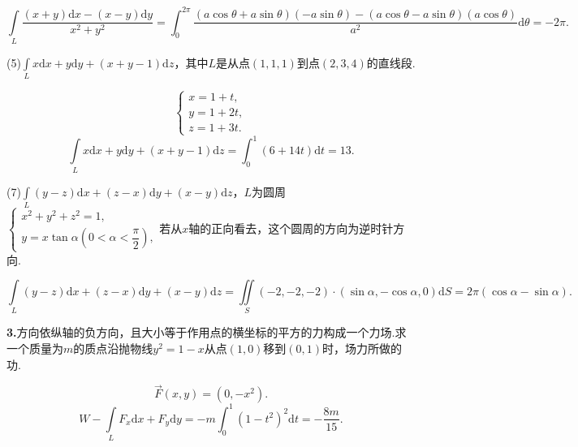 \documentclass[12pt, a4paper]{article}
\newcommand{\dif}{\mathrm{d}}
\begin{document}
\[\int\limits_L \dfrac{(x + y) \dif x - (x - y) \dif y}{x^2 + y^2} = \int_{0}^{2\pi} \frac{(a\cos\theta + a\sin\theta)(-a\sin\theta) - (a\cos\theta - a\sin\theta)(a\cos\theta)}{a^2} \dif \theta = -2\pi.\]

(5)\(\int\limits_L x \dif x + y \dif y + (x + y - 1) \dif z\)，其中\(L\)是从点\((1, 1, 1)\)到点\((2, 3, 4)\)的直线段.

\[\begin{cases}
x = 1 + t, \\
y = 1 + 2t, \\
z = 1 + 3t.
\end{cases}\]
\[\int\limits_L x \dif x + y \dif y + (x + y - 1) \dif z = \int_0^1 (6 + 14t) \dif t = 13.\]

(7)\(\int\limits_L (y - z) \dif x + (z - x) \dif y + (x - y) \dif z\)，\(L\)为圆周\(\begin{cases}
x^2 + y^2 + z^2 = 1, \\
y = x\tan\alpha \left(0 < \alpha < \dfrac{\pi}{2}\right),
\end{cases}\)若从\(x\)轴的正向看去，这个圆周的方向为逆时针方向.

\[\int\limits_L (y - z) \dif x + (z - x) \dif y + (x - y) \dif z = \iint\limits_S (-2, -2, -2) \cdot (\sin\alpha, -\cos\alpha, 0) \dif S = 2\pi(\cos\alpha - \sin\alpha).\]

\textbf{3.}方向依纵轴的负方向，且大小等于作用点的横坐标的平方的力构成一个力场.求一个质量为\(m\)的质点沿抛物线\(y^2 = 1 - x\)从点\((1, 0)\)移到\((0, 1)\)时，场力所做的功.

\[\vec{F}(x, y) = (0, -x^2).\]
\[W - \int\limits_L F_x \dif x + F_y \dif y = -m\int_0^1 (1 - t^2)^2 \dif t = -\frac{8m}{15}.\]
\end{document}
